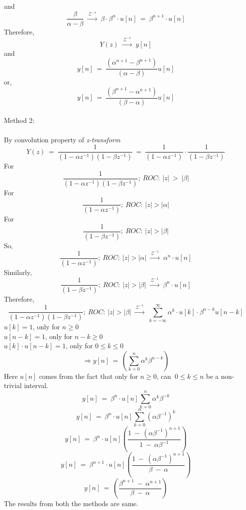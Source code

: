 and
\[
\frac{\beta}{\alpha - \beta}\ \xrightarrow{\ \mathcal{Z}^{-1}\ }\ \beta \cdot \beta^n \cdot u[n]\ =\ \beta^{n+1}\cdot u[n]
\]
Therefore,
\[
Y(z)\ \xrightarrow{\ \mathcal{Z}^{-1} \ }\ y[n]
\]
and
\[
y[n]\ =\ \frac{(\alpha^{n+1} - \beta^{n+1})}{(\alpha - \beta)}u[n]
\]
or,
\[
y[n]\ =\ \frac{(\beta^{n+1} - \alpha^{n+1})}{(\beta - \alpha)}u[n]
\]
\\ Method 2: \\\\
By convolution property of \textit{z-transform}
\[
Y(z)\ =\ \frac{1}{(1 - \alpha z^{-1})(1 - \beta z^{-1})}\ =\ \frac{1}{(1 - \alpha z^{-1})}\cdot \frac{1}{(1 - \beta z^{-1})}
\]
For \[\frac{1}{(1 - \alpha z^{-1})(1 - \beta z^{-1})};\ ROC:\ |z|\ >\ |\beta|\]
For \[\frac{1}{(1 - \alpha z^{-1})};\ ROC:\ |z| > |\alpha|\]
For \[\frac{1}{(1 - \beta z^{-1})};\ ROC:\ |z| > |\beta|\]
So, \[\frac{1}{(1 - \alpha z^{-1})};\ ROC:\ |z| > |\alpha|\ \xrightarrow{\ \mathcal{Z}^{-1}\ }\ \alpha^n \cdot u[n] 
\]
Similarly, \[\frac{1}{(1 - \beta z^{-1})};\ ROC:\ |z| > |\beta|\ \xrightarrow{\ \mathcal{Z}^{-1}\ }\ \beta^n \cdot u[n] 
\]
Therefore, \[\frac{1}{(1 - \alpha z^{-1})(1 - \beta z^{-1})};\ ROC:\ |z| > |\beta|\ \xrightarrow{\ \mathcal{Z}^{-1}\ }\ \sum\limits_{k=-\infty}^{\infty}\alpha^k\cdot u[k]\cdot\beta^{n-k}u[n-k] \]
$u[k] = 1$, only for $n \geq  0$\\
$u[n-k] = 1$, only for $n-k \geq  0$\\
$u[k]\cdot u[n-k] = 1$, only for $0 \leq k\leq 0$\\
\[\Rightarrow y[n]\ =\ (\sum\limits_{k=0}^{n}\alpha^k\beta^{n-k})\]
Here $u[n]$ comes from the fact that only for $n\geq 0$, can $\ 0 \leq k\leq n$  be a non-trivial interval.
\[
y[n]\ =\ \beta^n\cdot u[n]\sum\limits_{k=0}^{n}\alpha^k\beta^{-k}
\]
\[
y[n]\ =\ \beta^n\cdot u[n]\sum\limits_{k=0}^{n}(\alpha\beta^{-1})^k
\]
\[
y[n]\ =\ \beta^n\cdot u[n](\frac{1\ -\ (\alpha\beta^{-1})^{n+1}}{1\ -\ \alpha\beta^{-1}})
\]
\[
y[n]\ =\ \beta^{n+1}\cdot u[n](\frac{1\ -\ (\alpha\beta^{-1})^{n+1}}{\beta\ -\ \alpha})
\]
\[
y[n]\ =\ (\frac{\beta^{n+1}\ -\ \alpha^{n+1}}{\beta\ -\ \alpha})
\]
The results from both the methods are same.
